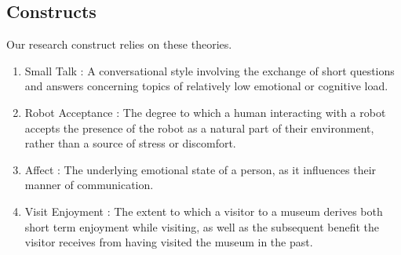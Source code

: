 \subsection{Constructs}

Our research construct relies on these theories. 

\begin{enumerate}
\item Small Talk\cite{ren1}
: A conversational style involving the exchange of short questions and
  answers concerning topics of relatively low emotional or cognitive
  load.
\item Robot Acceptance\cite{syrdal1}
: The degree to which a human interacting with a robot accepts the
  presence of the robot as a natural part of their environment, rather
  than a source of stress or discomfort.
\item Affect\cite{picard1}
: The underlying emotional state of a person, as it influences their manner of communication.
\item Visit Enjoyment\cite{othman1}
: The extent to which a visitor to a museum derives both short term
  enjoyment while visiting, as well as the subsequent benefit the
  visitor receives from having visited the museum in the past.
\end{enumerate}
